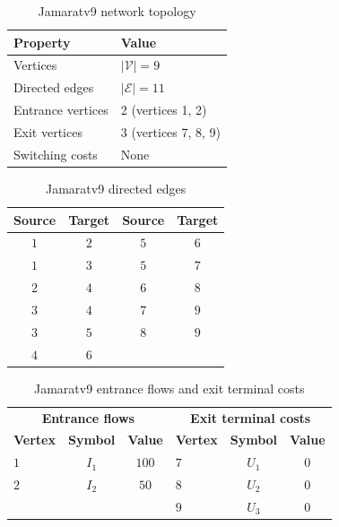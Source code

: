 
\begin{table}[h!]
\caption{Jamaratv9 network topology}
\label{tab:jamaratv9-topology}
\centering
\begin{tabular}{ll}
\toprule
\textbf{Property} & \textbf{Value} \\
\midrule
Vertices & $|\mathcal{V}| = 9$ \\
Directed edges & $|\mathcal{E}| = 11$ \\
Entrance vertices & 2 (vertices 1, 2) \\
Exit vertices & 3 (vertices 7, 8, 9) \\
Switching costs & None \\
\bottomrule
\end{tabular}
\end{table}

\begin{table}[h!]
\caption{Jamaratv9 directed edges}
\label{tab:jamaratv9-edges}
\centering
\begin{tabular}{cccc}
\toprule
\textbf{Source} & \textbf{Target} & \textbf{Source} & \textbf{Target} \\
\midrule
$1$ & $2$ & $5$ & $6$ \\
$1$ & $3$ & $5$ & $7$ \\
$2$ & $4$ & $6$ & $8$ \\
$3$ & $4$ & $7$ & $9$ \\
$3$ & $5$ & $8$ & $9$ \\
$4$ & $6$ &  &  \\
\bottomrule
\end{tabular}
\end{table}

\begin{table}[h!]
\caption{Jamaratv9 entrance flows and exit terminal costs}
\label{tab:jamaratv9-flow-costs}
\centering
\begin{tabular}{lcc|lcc}
\toprule
\multicolumn{3}{c}{\textbf{Entrance flows}} & \multicolumn{3}{c}{\textbf{Exit terminal costs}} \\
\textbf{Vertex} & \textbf{Symbol} & \textbf{Value} & \textbf{Vertex} & \textbf{Symbol} & \textbf{Value} \\
\midrule
$1$ & $I_1$ & $100$ & $7$ & $U_1$ & $0$ \\
$2$ & $I_2$ & $50$ & $8$ & $U_2$ & $0$ \\
 &  &  & $9$ & $U_3$ & $0$ \\
\bottomrule
\end{tabular}
\end{table}

